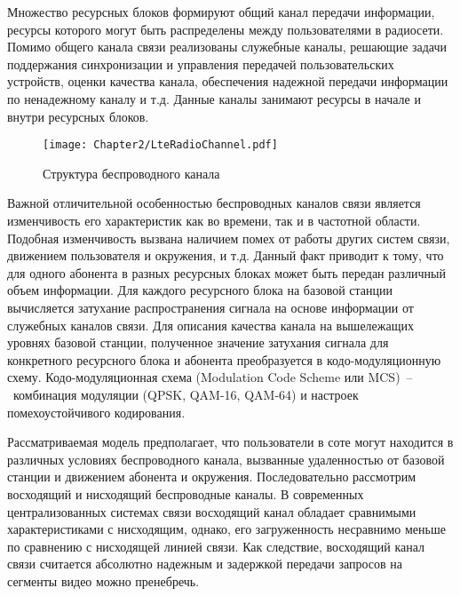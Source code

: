 Множество ресурсных блоков формируют общий канал передачи информации, ресурсы которого могут быть распределены между пользователями в радиосети. Помимо общего канала связи реализованы служебные каналы, решающие задачи поддержания синхронизации и управления передачей пользовательских устройств, оценки качества канала, обеспечения надежной передачи информации по ненадежному каналу и т.д. Данные каналы занимают ресурсы в начале и внутри ресурсных блоков.

\begin{figure}[htbp]
\begin{center}
\texttt{[image: Chapter2/LteRadioChannel.pdf]}
\caption{Структура беспроводного канала}
\label{fig:LteRadioChannel}
\end{center}
\end{figure}

Важной отличительной особенностью беспроводных каналов связи является изменчивость его характеристик как во времени, так и в частотной области. Подобная изменчивость вызвана наличием помех от работы других систем связи, движением пользователя и окружения, и т.д. Данный факт приводит к тому, что для одного абонента в разных ресурсных блоках может быть передан различный объем информации. Для каждого ресурсного блока на базовой станции вычисляется затухание распространения сигнала на основе информации от служебных каналов связи. Для описания качества канала на вышележащих уровнях базовой станции, полученное значение затухания сигнала для конкретного ресурсного блока и абонента преобразуется в кодо-модуляционную схему. Кодо-модуляционная схема (Modulation Code Scheme или MCS)~--~комбинация модуляции (QPSK, QAM-16, QAM-64) и настроек помехоустойчивого кодирования. %

Рассматриваемая модель предполагает, что пользователи в соте могут находится в различных условиях беспроводного канала, вызванные удаленностью от базовой станции и движением абонента и окружения. Последовательно рассмотрим восходящий и нисходящий беспроводные каналы. В современных централизованных системах связи восходящий канал обладает сравнимыми характеристиками с нисходящим, однако, его загруженность несравнимо меньше по сравнению с нисходящей линией связи. Как следствие, восходящий канал связи считается абсолютно надежным и задержкой передачи запросов на сегменты видео можно пренебречь.

